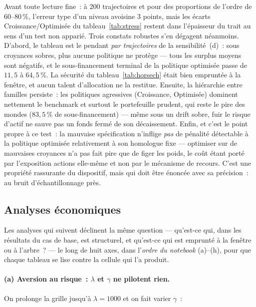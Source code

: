 \documentclass[11pt,letterpaper]{article}
\theoremstyle{definition}
\begin{document}
Avant toute lecture fine~: à $200$ trajectoires et pour des proportions de
l'ordre de $60$--$80\,\%$, l'erreur type d'un niveau avoisine $3$ points, mais
les écarts Croissance/Optimisée du tableau~\ref{tab:stress} restent dans
l'épaisseur du trait au sens d'un test non apparié. Trois constats robustes
s'en dégagent néanmoins.
D'abord, le tableau est le pendant \emph{par trajectoires} de la
sensibilité~(d)~: sous croyances sobres, plus aucune politique ne protège ---
tous les surplus moyens sont négatifs, et le sous-financement terminal de la
politique optimisée passe de $11{,}5$ à $64{,}5\,\%$. La sécurité du
tableau~\ref{tab:horsech} était bien empruntée à la fenêtre, et aucun talent
d'allocation ne la restitue. Ensuite, la hiérarchie entre familles
persiste~: les politiques agressives (Croissance, Optimisée) dominent
nettement le benchmark et surtout le portefeuille prudent, qui reste le pire
des mondes ($83{,}5\,\%$ de sous-financement) --- même sous un drift sobre,
fuir le risque d'actif ne sauve pas un fonds fermé de son décaissement.
Enfin, et c'est le point propre à ce test~: la mauvaise spécification
n'inflige \emph{pas} de pénalité détectable à la politique optimisée
relativement à son homologue fixe --- optimiser sur de mauvaises croyances
n'a pas fait pire que de figer les poids, le coût étant porté par
l'exposition actions elle-même et non par le mécanisme de recours. C'est une
propriété rassurante du dispositif, mais qui doit être énoncée avec sa
précision~: au bruit d'échantillonnage près.

\subsection{Analyses économiques}\label{ssec:resultats-analyses}

Les analyses qui suivent déclinent la même question --- qu'est-ce qui, dans
les résultats du cas de base, est structurel, et qu'est-ce qui est emprunté à
la fenêtre ou à l'arbre~? --- le long de huit axes, dans l'\emph{ordre du
notebook} (a)--(h), pour que chaque tableau se lise contre la cellule qui l'a
produit.

\paragraph{(a) Aversion au risque~: $\lambda$ et $\gamma$ ne pilotent rien.}
On prolonge la grille jusqu'à $\lambda = 1000$ et on fait varier $\gamma$~:
\end{document}

